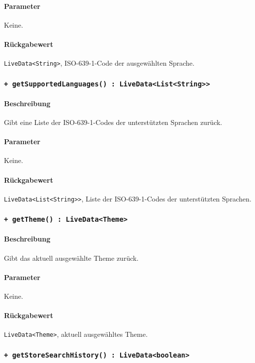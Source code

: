 \paragraph*{Parameter}
Keine.
\paragraph*{Rückgabewert}
\texttt{LiveData<String>}, ISO-639-1-Code der ausgewählten Sprache.

\subsubsection*{\texttt{+ getSupportedLanguages() : LiveData<List<String>>}}%
\paragraph*{Beschreibung}
Gibt eine Liste der ISO-639-1-Codes der unterstützten Sprachen zurück.
\paragraph*{Parameter}
Keine.
\paragraph*{Rückgabewert}
\texttt{LiveData<List<String>>}, Liste der ISO-639-1-Codes der unterstützten Sprachen.

\subsubsection*{\texttt{+ getTheme() : LiveData<Theme>}}%
\paragraph*{Beschreibung}
Gibt das aktuell ausgewählte Theme zurück.
\paragraph*{Parameter}
Keine.
\paragraph*{Rückgabewert}
\texttt{LiveData<Theme>}, aktuell ausgewähltes Theme.

\subsubsection*{\texttt{+ getStoreSearchHistory() : LiveData<boolean>}}%
